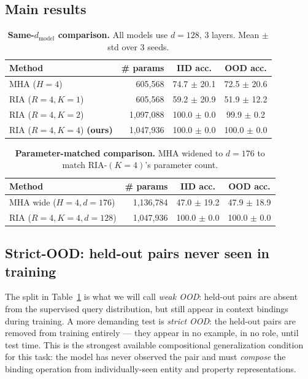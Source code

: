 \documentclass{article}
\begin{document}
\subsection{Main results}

\begin{table}[h]
\centering
\caption{\textbf{Same-$d_{\text{model}}$ comparison.} All models use
$d = 128$, 3 layers. Mean $\pm$ std over 3 seeds.}
\label{tab:main}
\begin{tabular}{lrcc}
\toprule
Method & \# params & IID acc. & OOD acc. \\
\midrule
MHA ($H{=}4$)  & 605,568  & 74.7 $\pm$ 20.1  & 72.5 $\pm$ 20.6 \\
RIA ($R{=}4, K{=}1$)  & 605,568  & 59.2 $\pm$ 20.9  & 51.9 $\pm$ 12.2 \\
RIA ($R{=}4, K{=}2$)  & 1,097,088  & 100.0 $\pm$ 0.0  & 99.9 $\pm$ 0.2 \\
RIA ($R{=}4, K{=}4$) \textbf{(ours)}  & 1,047,936  & 100.0 $\pm$ 0.0  & 100.0 $\pm$ 0.0 \\
\bottomrule
\end{tabular}
\end{table}

\begin{table}[h]
\centering
\caption{\textbf{Parameter-matched comparison.} MHA widened to
$d{=}176$ to match RIA-$(K{=}4)$'s parameter count.}
\label{tab:matched}
\begin{tabular}{lrcc}
\toprule
Method & \# params & IID acc. & OOD acc. \\
\midrule
MHA wide ($H{=}4, d{=}176$)  & 1,136,784  & 47.0 $\pm$ 19.2  & 47.9 $\pm$ 18.9 \\
RIA ($R{=}4, K{=}4, d{=}128$)  & 1,047,936  & 100.0 $\pm$ 0.0  & 100.0 $\pm$ 0.0 \\
\bottomrule
\end{tabular}
\end{table}

\subsection{Strict-OOD: held-out pairs never seen in training}
\label{sec:strict}

The split in Table~\ref{tab:main} is what we will call \emph{weak OOD}:
held-out pairs are absent from the supervised query distribution, but
still appear in context bindings during training. A more demanding
test is \emph{strict OOD}: the held-out pairs are removed from
training entirely --- they appear in no example, in no role, until
test time. This is the strongest available compositional generalization
condition for this task: the model has never observed the pair and
must \emph{compose} the binding operation from individually-seen
entity and property representations.
\end{document}
